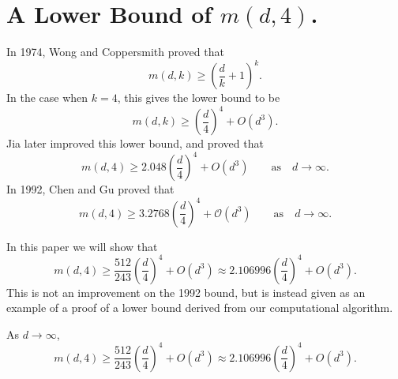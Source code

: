 \section{ A Lower Bound of $m(d, 4)$.}
In 1974, Wong and Coppersmith proved that
\[m(d, k) \geq \left (\frac{d}{k} + 1\right)^k.\]
In the case when $k = 4$, this gives the lower bound to be
\[m(d, k) \geq \left (\frac{d}{4}\right )^4 + O(d^3).\]
Jia later improved this lower bound, and proved that 
\[ 
m(d, 4) \geq2.048 \left(\frac{d}{4}\right)^4  +O(d^3)\qquad\text{as}\quad d\to\infty.
\]
In 1992, Chen and Gu proved that
\[
m(d, 4) \geq 3.2768\left(\frac{d}{4}\right)^4 + \mathcal{O}(d^{3}) \qquad\text{as}\quad d\to\infty.
\]

In this paper we will show that \[m(d,4) \geq \frac{512}{243}\left(\frac d4\right)^4 + O(d^3)\approx 2.106996 \left(\frac d4\right)^4 + O(d^3).\]  This is not an improvement on the 1992 bound, but is instead given as an example of a proof of a lower bound derived from our computational algorithm.
\begin{theorem} As $d\to\infty$, 
\[
m(d,4) \geq \frac{512}{243}\left(\frac d4\right)^4 + O(d^3)\approx 2.106996 \left(\frac d4\right)^4 + O(d^3).
\]
\end{theorem}

